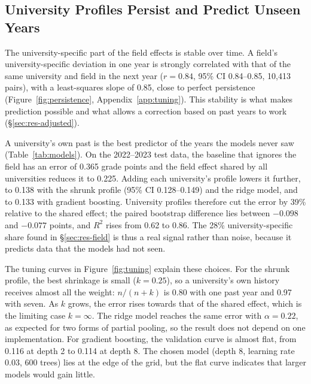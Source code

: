 
\subsection{University Profiles Persist and Predict Unseen Years}
\label{sec:res-prediction}

The university-specific part of the field effects is stable over time. A field's university-specific deviation in one year is strongly correlated with that of the same university and field in the next year ($r = 0.84$, 95\% CI 0.84--0.85, 10,413 pairs), with a least-squares slope of 0.85, close to perfect persistence (Figure~\ref{fig:persistence}, Appendix~\ref{app:tuning}). This stability is what makes prediction possible and what allows a correction based on past years to work (\S\ref{sec:res-adjusted}).

A university's own past is the best predictor of the years the models never saw (Table~\ref{tab:models}). On the 2022--2023 test data, the baseline that ignores the field has an error of 0.365 grade points and the field effect shared by all universities reduces it to 0.225. Adding each university's profile lowers it further, to 0.138 with the shrunk profile (95\% CI 0.128--0.149) and the ridge model, and to 0.133 with gradient boosting. University profiles therefore cut the error by 39\% relative to the shared effect; the paired bootstrap difference lies between $-0.098$ and $-0.077$ points, and $R^2$ rises from 0.62 to 0.86. The 28\% university-specific share found in \S\ref{sec:res-field} is thus a real signal rather than noise, because it predicts data that the models had not seen.



The tuning curves in Figure~\ref{fig:tuning} explain these choices. For the shrunk profile, the best shrinkage is small ($k = 0.25$), so a university's own history receives almost all the weight: $n/(n+k)$ is 0.80 with one past year and 0.97 with seven. As $k$ grows, the error rises towards that of the shared effect, which is the limiting case $k = \infty$. The ridge model reaches the same error with $\alpha = 0.22$, as expected for two forms of partial pooling, so the result does not depend on one implementation. For gradient boosting, the validation curve is almost flat, from 0.116 at depth 2 to 0.114 at depth 8. The chosen model (depth 8, learning rate 0.03, 600 trees) lies at the edge of the grid, but the flat curve indicates that larger models would gain little.

